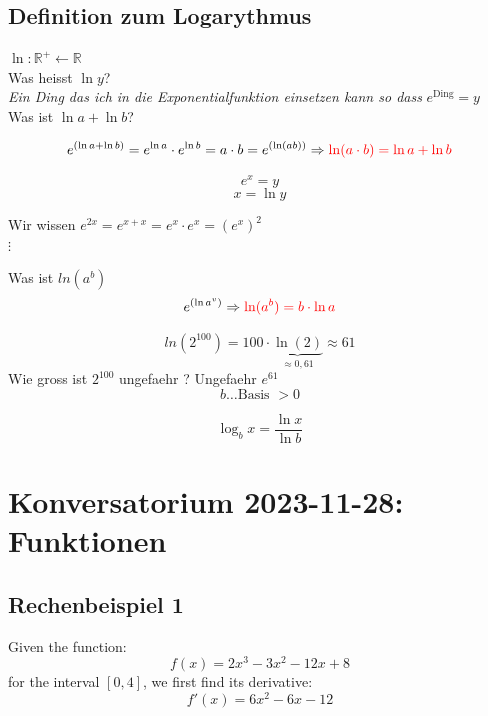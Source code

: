 \documentclass{article}
\theoremstyle{mytheoremstyle}
\theoremstyle{mytheoremstyle}
\theoremstyle{myproblemstyle}
\begin{document}
    \bigskip

    \subsection{Definition zum Logarythmus}

    \begin{multicols}{2}
        $\ln: \mathbb{R ^ {+}} \leftarrow \mathbb{R}$ \\ 
        Was heisst $\ln  y$?  \\ 
        \textit{Ein Ding das ich in die Exponentialfunktion einsetzen kann so dass} $e ^ {\text{Ding}} = y$ \\ 
        Was ist $\ln a + \ln b$? 
        
        \[
            e ^ {(\ln a + \ln b)} = e ^ {\ln a} \cdot e ^ {\ln b} =  a \cdot b = e ^ {(\ln (a b))}
            \Rightarrow \color{red} \ln (a \cdot b) = \ln a + \ln b \color{black}
        \]
        \columnbreak

        \[e ^ {x} = y \]
        \[x = \ln y\]
    \end{multicols}
    
    \bigskip

    Wir wissen $e ^ {2x} = e ^ {x + x} = e ^ {x} \cdot e ^ {x } = (e ^ {x}) ^ {2}$ \\ 
    $\vdots$  
    \begin{multicols}{2}
        Was ist $ln(a ^ {b})$
        \[
            e ^ {(\ln a ^ {v})} \Rightarrow  \color{red} \ln (a ^ {b}) = b \cdot \ln a \color{black}
        \] 

        \columnbreak

        \[
            ln (2 ^ {100} ) = 100 \cdot \underbrace{\ln (2)}_{\approx 0,61} \approx 61
        \]
        Wie gross ist $2 ^ {100}$ ungefaehr ? Ungefaehr $e ^ {61}$ 
        \[
            b \ldots  \text{Basis } > 0
        \]
        \begin{definition}[Logarythmus]
            \[\log_{b} x = \frac{\ln x}{\ln b} 
    \]
        \end{definition}
    \end{multicols}
    
    \section{Konversatorium 2023-11-28: \textbf{Funktionen}}

    \subsection{Rechenbeispiel 1}
    Given the function:
\[ f(x) = 2x^3 - 3x^2 - 12x + 8 \]
for the interval \([0, 4]\), we first find its derivative:
\[ f'(x) = 6x^2 - 6x - 12 \]
\end{document}
